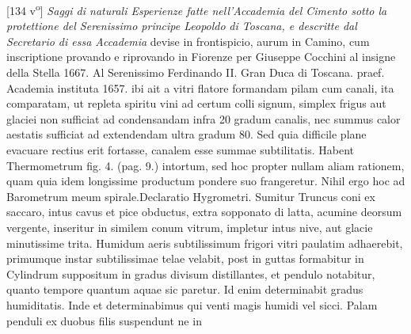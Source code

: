                 \vspace*{8mm}
                \pstart 
                \normalsize
            [134 v\textsuperscript{o}] \textit{Saggi di naturali Esperienze fatte nell'Accademia del Cimento sotto la protettione del Serenissimo principe Leopoldo}\protect{} \textit{di Toscana, e descritte dal Secretario di essa Accademia} devise in frontispicio, aurum in Camino, cum inscriptione  provando e riprovando in Fiorenze\protect{} per Giuseppe Cocchini\protect{}  al insigne della Stella 1667. Al Serenissimo Ferdinando II. Gran Duca di Toscana\protect{}.\pend \pstart {} praef. Academia instituta 1657.\pend \pstart {}  ibi ait a vitri flatore formandam pilam\protect{} cum canali, ita comparatam, ut repleta spiritu vini\protect{} ad certum colli signum, simplex  frigus aut glaciei non sufficiat ad condensandam infra 20 gradum  canalis, nec summus calor aestatis  sufficiat ad extendendam  ultra gradum 80. Sed quia difficile plane evacuare rectius  erit fortasse, canalem esse summae subtilitatis. Habent Thermometrum\protect{} fig. 4. (pag. 9.) intortum, sed hoc propter  nullam aliam rationem, quam quia idem longissime productum  pondere suo frangeretur. Nihil ergo hoc ad Barometrum\protect{}  meum spirale.\pend\clearpage \pstart Declaratio Hygrometri\protect{}. Sumitur Truncus coni ex saccaro,  intus cavus et pice obductus, extra sopponato di latta,  acumine deorsum vergente, inseritur in similem conum vitrum,  impletur intus nive, aut glacie minutissime trita. Humidum  aeris subtilissimum frigori vitri paulatim adhaerebit, primumque  instar subtilissimae telae velabit, post in guttas formabitur  in Cylindrum suppositum in gradus divisum distillantes, et pendulo\protect{}  notabitur, quanto tempore quantum aquae sic paretur. Id enim  determinabit gradus humiditatis. Inde et determinabimus qui venti  magis humidi vel sicci.\pend \pstart {}\protect{} Palam penduli\protect{} ex duobus filis  suspendunt ne in
